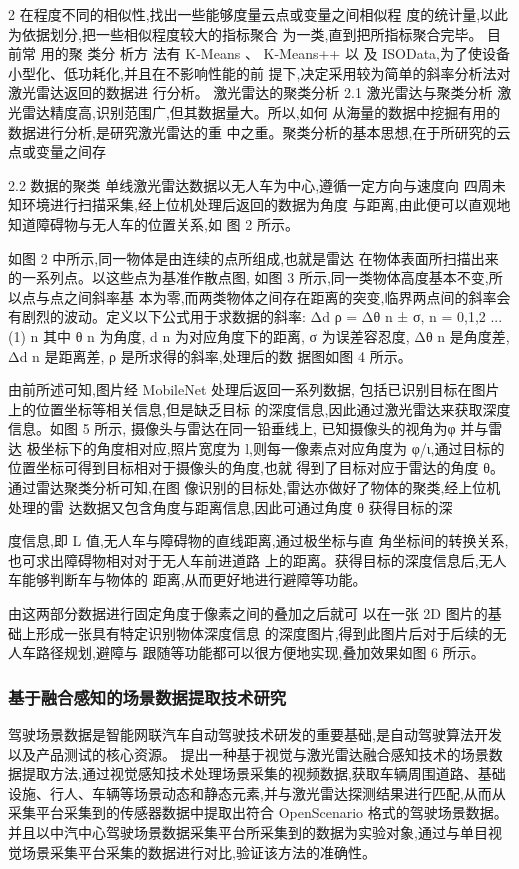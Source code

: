 \documentclass{amsart}
\begin{document}
2
在程度不同的相似性,找出一些能够度量云点或变量之间相似程
度的统计量,以此为依据划分,把一些相似程度较大的指标聚合
为一类,直到把所指标聚合完毕。
目 前常 用的聚 类分 析方 法有 K-Means 、 K-Means++ 以 及
ISOData,为了使设备小型化、低功耗化,并且在不影响性能的前
提下,决定采用较为简单的斜率分析法对激光雷达返回的数据进
行分析。
激光雷达的聚类分析
2.1 激光雷达与聚类分析
激光雷达精度高,识别范围广,但其数据量大。所以,如何
从海量的数据中挖掘有用的数据进行分析,是研究激光雷达的重
中之重。聚类分析的基本思想,在于所研究的云点或变量之间存

2.2 数据的聚类
单线激光雷达数据以无人车为中心,遵循一定方向与速度向
四周未知环境进行扫描采集,经上位机处理后返回的数据为角度
与距离,由此便可以直观地知道障碍物与无人车的位置关系,如
图 2 所示。

如图 2 中所示,同一物体是由连续的点所组成,也就是雷达
在物体表面所扫描出来的一系列点。以这些点为基准作散点图,
如图 3 所示,同一类物体高度基本不变,所以点与点之间斜率基
本为零,而两类物体之间存在距离的突变,临界两点间的斜率会
有剧烈的波动。定义以下公式用于求数据的斜率:
Δd
ρ = Δθ n ± σ, n = 0,1,2 ...
(1)
n
其中 θ n 为角度, d n 为对应角度下的距离, σ 为误差容忍度,
Δθ n 是角度差, Δd n 是距离差, ρ 是所求得的斜率,处理后的数
据图如图 4 所示。

由前所述可知,图片经 MobileNet 处理后返回一系列数据,
包括已识别目标在图片上的位置坐标等相关信息,但是缺乏目标
的深度信息,因此通过激光雷达来获取深度信息。如图 5 所示,
摄像头与雷达在同一铅垂线上,
已知摄像头的视角为φ 并与雷达
极坐标下的角度相对应,照片宽度为 l,则每一像素点对应角度为
φ/ι,通过目标的位置坐标可得到目标相对于摄像头的角度,也就
得到了目标对应于雷达的角度 θ。通过雷达聚类分析可知,在图
像识别的目标处,雷达亦做好了物体的聚类,经上位机处理的雷
达数据又包含角度与距离信息,因此可通过角度 θ 获得目标的深

度信息,即 L 值,无人车与障碍物的直线距离,通过极坐标与直
角坐标间的转换关系,也可求出障碍物相对对于无人车前进道路
上的距离。获得目标的深度信息后,无人车能够判断车与物体的
距离,从而更好地进行避障等功能。

由这两部分数据进行固定角度于像素之间的叠加之后就可
以在一张 2D 图片的基础上形成一张具有特定识别物体深度信息
的深度图片,得到此图片后对于后续的无人车路径规划,避障与
跟随等功能都可以很方便地实现,叠加效果如图 6 所示。

\subsubsection{基于融合感知的场景数据提取技术研究}
\cite{李英勃}驾驶场景数据是智能网联汽车自动驾驶技术研发的重要基础,是自动驾驶算法开发以及产品测试的核心资源。
提出一种基于视觉与激光雷达融合感知技术的场景数据提取方法,通过视觉感知技术处理场景采集的视频数据,获取车辆周围道路、基础设施、行人、车辆等场景动态和静态元素,并与激光雷达探测结果进行匹配,从而从采集平台采集到的传感器数据中提取出符合 OpenScenario 格式的驾驶场景数据。
并且以中汽中心驾驶场景数据采集平台所采集到的数据为实验对象,通过与单目视觉场景采集平台采集的数据进行对比,验证该方法的准确性。
\end{document}
